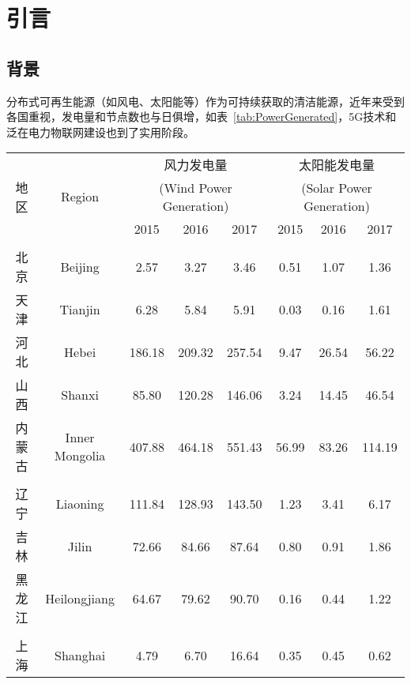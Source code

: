 \chapter{引言}
\label{cha:Intro}

\section{背景}

分布式可再生能源（如风电、太阳能等）作为可持续获取的清洁能源，近年来受到各国重视，发电量和节点数也与日俱增，如表~\ref{tab:PowerGenerated}，5G技术和泛在电力物联网建设也到了实用阶段。

\begin{table}[]
    \centering
    \begin{tabular}{|c|c|c|c|c|c|c|c|}
    \hline
    \multirow{3}{*}{地  区} & \multirow{3}{*}{Region} & \multicolumn{3}{c|}{风力发电量} & \multicolumn{3}{c|}{太阳能发电量} \\ \cline{3-8} 
     &  & \multicolumn{3}{c|}{(Wind Power Generation)} & \multicolumn{3}{c|}{(Solar Power Generation)} \\ \cline{3-8} 
     &  & 2015 & 2016 & 2017 & 2015 & 2016 & 2017 \\ \hline
     &  &  &  &  &  &  &  \\ \hline
    北  京 & Beijing & 2.57 & 3.27 & 3.46 & 0.51 & 1.07 & 1.36 \\ \hline
    天  津 & Tianjin & 6.28 & 5.84 & 5.91 & 0.03 & 0.16 & 1.61 \\ \hline
    河  北 & Hebei & 186.18 & 209.32 & 257.54 & 9.47 & 26.54 & 56.22 \\ \hline
    山  西 & Shanxi & 85.80 & 120.28 & 146.06 & 3.24 & 14.45 & 46.54 \\ \hline
    内蒙古 & Inner Mongolia & 407.88 & 464.18 & 551.43 & 56.99 & 83.26 & 114.19 \\ \hline
     &  &  &  &  &  &  &  \\ \hline
    辽  宁 & Liaoning & 111.84 & 128.93 & 143.50 & 1.23 & 3.41 & 6.17 \\ \hline
    吉  林 & Jilin & 72.66 & 84.66 & 87.64 & 0.80 & 0.91 & 1.86 \\ \hline
    黑龙江 & Heilongjiang & 64.67 & 79.62 & 90.70 & 0.16 & 0.44 & 1.22 \\ \hline
     &  &  &  &  &  &  &  \\ \hline
    上  海 & Shanghai & 4.79 & 6.70 & 16.64 & 0.35 & 0.45 & 0.62 \\ \hline

\end{tabular}
\end{table}
